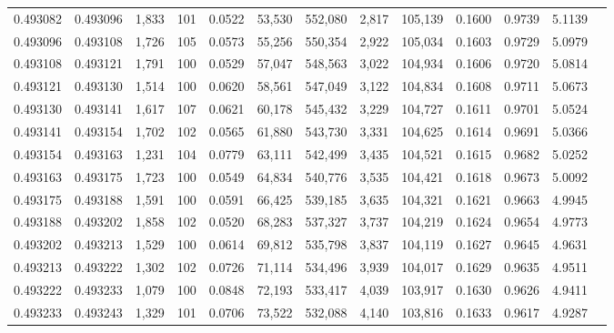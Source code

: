 \begin{tabular}{rrrrrrrrrrrrr}
0.493082 & 0.493096 & 1,833 & 101 &                                     0.0522 &  53,530 & 552,080 &   2,817 & 105,139 & 0.1600 & 0.9739 & 5.1139 \\
0.493096 & 0.493108 & 1,726 & 105 &                                     0.0573 &  55,256 & 550,354 &   2,922 & 105,034 & 0.1603 & 0.9729 & 5.0979 \\
0.493108 & 0.493121 & 1,791 & 100 &                                     0.0529 &  57,047 & 548,563 &   3,022 & 104,934 & 0.1606 & 0.9720 & 5.0814 \\
0.493121 & 0.493130 & 1,514 & 100 &                                     0.0620 &  58,561 & 547,049 &   3,122 & 104,834 & 0.1608 & 0.9711 & 5.0673 \\
0.493130 & 0.493141 & 1,617 & 107 &                                     0.0621 &  60,178 & 545,432 &   3,229 & 104,727 & 0.1611 & 0.9701 & 5.0524 \\
0.493141 & 0.493154 & 1,702 & 102 &                                     0.0565 &  61,880 & 543,730 &   3,331 & 104,625 & 0.1614 & 0.9691 & 5.0366 \\
0.493154 & 0.493163 & 1,231 & 104 &                                     0.0779 &  63,111 & 542,499 &   3,435 & 104,521 & 0.1615 & 0.9682 & 5.0252 \\
0.493163 & 0.493175 & 1,723 & 100 &                                     0.0549 &  64,834 & 540,776 &   3,535 & 104,421 & 0.1618 & 0.9673 & 5.0092 \\
0.493175 & 0.493188 & 1,591 & 100 &                                     0.0591 &  66,425 & 539,185 &   3,635 & 104,321 & 0.1621 & 0.9663 & 4.9945 \\
0.493188 & 0.493202 & 1,858 & 102 &                                     0.0520 &  68,283 & 537,327 &   3,737 & 104,219 & 0.1624 & 0.9654 & 4.9773 \\
0.493202 & 0.493213 & 1,529 & 100 &                                     0.0614 &  69,812 & 535,798 &   3,837 & 104,119 & 0.1627 & 0.9645 & 4.9631 \\
0.493213 & 0.493222 & 1,302 & 102 &                                     0.0726 &  71,114 & 534,496 &   3,939 & 104,017 & 0.1629 & 0.9635 & 4.9511 \\
0.493222 & 0.493233 & 1,079 & 100 &                                     0.0848 &  72,193 & 533,417 &   4,039 & 103,917 & 0.1630 & 0.9626 & 4.9411 \\
0.493233 & 0.493243 & 1,329 & 101 &                                     0.0706 &  73,522 & 532,088 &   4,140 & 103,816 & 0.1633 & 0.9617 & 4.9287 \\

\end{tabular}

